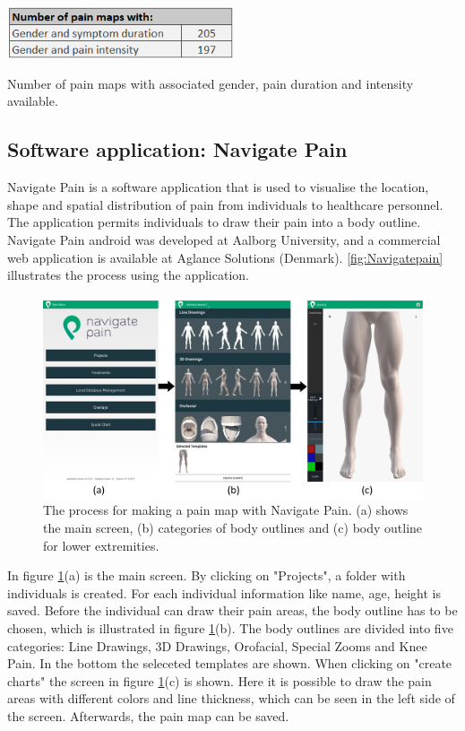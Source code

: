 \begin{table} [H]
\centering
\includegraphics[width=0.5\textwidth]{figures/numberofpain}
\caption{Number of pain maps with associated gender, pain duration and intensity available. }
\label{tab:numberofpain}
\end{table}


\subsection{Software application: Navigate Pain} \label{sec:nav}
Navigate Pain is a software application that is used to visualise the location, shape and spatial distribution of pain from individuals to healthcare personnel. The application permits individuals to draw their pain into a body outline. Navigate Pain android was developed at Aalborg University, and a commercial web application is available at Aglance Solutions (Denmark).\citep{Solutions2015}
\autoref{fig:Navigatepain} illustrates the process using the application.

\begin{figure} [H]
\centering
\includegraphics[width=1\textwidth]{figures/Navigatepain}
\caption{The process for making a pain map with Navigate Pain. (a) shows the main screen, (b) categories of body outlines and (c) body outline for lower extremities.}
\label{fig:Navigatepain}
\end{figure}

\noindent
In figure \ref{fig:Navigatepain}(a) is the main screen. By clicking on "Projects", a folder with individuals is created. For each individual information like name, age, height is saved. Before the individual can draw their pain areas, the body outline has to be chosen, which is illustrated in figure \ref{fig:Navigatepain}(b). The body outlines are divided into five categories: Line Drawings, 3D Drawings, Orofacial, Special Zooms and Knee Pain. In the bottom the seleceted templates are shown. When clicking on "create charts" the screen in figure \ref{fig:Navigatepain}(c) is shown. Here it is possible to draw the pain areas with different colors and line thickness, which can be seen in the left side of the screen. Afterwards, the pain map can be saved.


